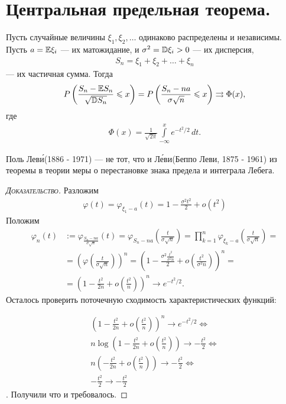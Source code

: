 \documentclass[../main.tex]{subfiles}
\begin{document}
\section{Центральная предельная теорема.}

\begin{thm}
 \label{theorem:central_limit_theorem_Levi}
 Пусть случайные величины $ \xi_1, \xi_2, \ldots $  одинаково распределены и независимы. Пусть $ a = \mathbb E \xi_i $ --- их матожидание, и  $ \sigma^{2} = \mathbb D \xi_i > 0 $  --- их дисперсия,
 \begin{align*}
  S_n = \xi_1 + \xi_2 + \ldots + \xi_n
 \end{align*} --- их частичная сумма. Тогда
 \begin{align*}
  P\left(\frac{S_n - \mathbb E S_n}{\sqrt{\mathbb D S_n}} \leqslant x\right) = P \left( \frac{S_n - na}{\sigma \sqrt n} \leqslant x \right) \rightrightarrows \Phi(x),
 \end{align*} где
 \begin{align*}
  \Phi(x) = \frac{1}{\sqrt{2\pi}} \int\limits_{-\infty}^{x} e^{-t^{2} / 2}\,dt.
 \end{align*}
\end{thm}
\begin{remrk*}
 Поль Лев\'{и}(1886 - 1971) --- не тот, что и Л\'{е}ви(Беппо Леви, 1875 - 1961) из теоремы в теории меры о перестановке знака предела и интеграла Лебега.
\end{remrk*}
\begin{proof}[\normalfont\textsc{Доказательство}]
 Разложим
 \begin{align*}
  \varphi(t) = \varphi_{\xi_1 - a}(t) = 1 - \frac{\sigma^{2}t^{2}}{2} + o(t^{2})
 \end{align*} Положим
 \begin{align*}
  \varphi_n(t) &:= \varphi_{\frac{S_n - na}{\sigma \sqrt n}}(t) = \varphi_{S_n - na} \left( \frac{t}{\sigma \sqrt n} \right) = \prod_{k=1}^{n} \varphi_{\xi_k - a} \left( \frac{t}{\sigma \sqrt n} \right) = \\
  &= \left(\varphi \left( \frac{t}{\sigma \sqrt n} \right) \right)^{n} = \left( 1- \frac{\sigma^{2} \frac{t^{2}}{\sigma^{2} n}}{2} + o \left( \frac{t^{2}}{\sigma^{2} n} \right) \right)^{n} = \\
  &= \left( 1 - \frac{t^{2}}{2n} + o \left( \frac{t^{2}}{n} \right) \right)^{n} \to e^{-t^{2} / 2}.
 \end{align*} Осталось проверить поточечную сходимость характеристических функций:

 \begin{align*}
	 \left(1 - \frac{t^2}{2n} + o\left(\frac{t^2}{n}\right)\right)^{n} \to e^{-t^2/2} \Longleftrightarrow \\
	 n \log \left(1 - \frac{t^2}{2n} + o\left(\frac{t^2}{n}\right)\right) \to - \frac{t^2}{2} \Longleftrightarrow \\
	 n \left(-\frac{t^2}{2n} + o\left(\frac{t^2}{n}\right)\right) \to -\frac{t^2}{2} \Longleftrightarrow \\
	 -\frac{t^2}{2} \to -\frac{t^2}{2}
 \end{align*}. Получили что и требовалось.

\end{proof}
\end{document}
